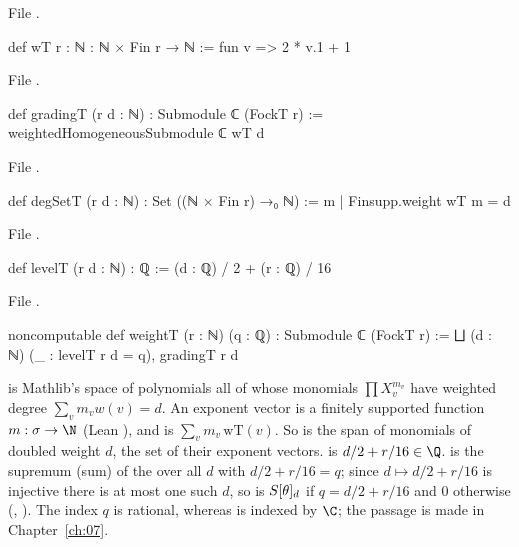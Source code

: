 \noindent File .
\begin{leancode}
def wT {r : ℕ} : ℕ × Fin r → ℕ := fun v => 2 * v.1 + 1
\end{leancode}
\noindent File .
\begin{leancode}
def gradingT (r d : ℕ) : Submodule ℂ (FockT r) := weightedHomogeneousSubmodule ℂ wT d
\end{leancode}
\noindent File .
\begin{leancode}
def degSetT (r d : ℕ) : Set ((ℕ × Fin r) →₀ ℕ) := {m | Finsupp.weight wT m = d}
\end{leancode}
\noindent File .
\begin{leancode}
def levelT (r d : ℕ) : ℚ := (d : ℚ) / 2 + (r : ℚ) / 16
\end{leancode}
\noindent File .
\begin{leancode}
noncomputable def weightT (r : ℕ) (q : ℚ) : Submodule ℂ (FockT r) :=
  ⨆ (d : ℕ) (_ : levelT r d = q), gradingT r d
\end{leancode}
\begin{dictionary}
 is Mathlib's space of polynomials all of whose monomials
$\prod X_v^{m_v}$ have weighted degree $\sum_v m_v w(v)=d$.  An exponent vector is a finitely
supported function $m:\sigma\to\N$ (Lean ), and  is
$\sum_v m_v\,\mathrm{wT}(v)$.  So  is the span of monomials of doubled weight
$d$,  the set of their exponent vectors.   is $d/2+r/16\in\Q$.
 is the supremum (sum) of the  over all $d$ with
$d/2+r/16=q$; since $d\mapsto d/2+r/16$ is injective there is at most one such $d$, so
 is $S[\theta]_d$ if $q=d/2+r/16$ and $0$ otherwise (,
).  The index $q$ is rational, whereas  is indexed
by $\C$; the passage is made in Chapter~\ref{ch:07}.
\end{dictionary}

